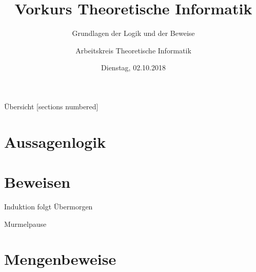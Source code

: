 

\title{Vorkurs Theoretische Informatik}
\subtitle{Grundlagen der Logik und der Beweise}
\date{Dienstag, 02.10.2018}
\author{Arbeitskreis Theoretische Informatik}



\maketitle

\begin{frame}[fragile]{Übersicht}
  [sections numbered]
  \tableofcontents
\end{frame}

\section{Aussagenlogik}



\section{Beweisen}









\begin{frame}[standout]
  Induktion folgt Übermorgen
\end{frame}

\begin{frame}[standout]
    Murmelpause
\end{frame}


\section{Mengenbeweise}




